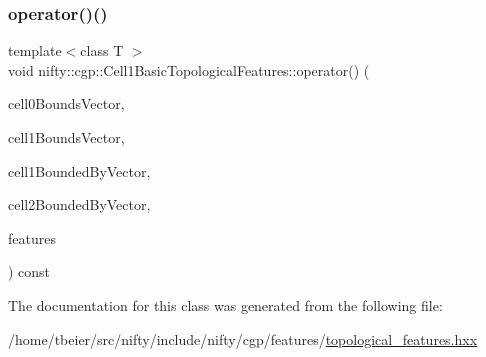 \mbox{\label{classnifty_1_1cgp_1_1Cell1BasicTopologicalFeatures_aab5336ea5c4f981c15b4860c4f476795}} 
\subsubsection{\texorpdfstring{operator()()}{operator()()}}
{\footnotesize\ttfamily template$<$class T $>$ \\
void nifty\+::cgp\+::\+Cell1\+Basic\+Topological\+Features\+::operator() (\begin{DoxyParamCaption}\item[{const \hyperlink{classnifty_1_1cgp_1_1CellBoundsVector}{Cell\+Bounds\+Vector}$<$ 2, 0 $>$ \&}]{cell0\+Bounds\+Vector,  }\item[{const \hyperlink{classnifty_1_1cgp_1_1CellBoundsVector}{Cell\+Bounds\+Vector}$<$ 2, 1 $>$ \&}]{cell1\+Bounds\+Vector,  }\item[{const \hyperlink{classnifty_1_1cgp_1_1CellBoundedByVector}{Cell\+Bounded\+By\+Vector}$<$ 2, 1 $>$ \&}]{cell1\+Bounded\+By\+Vector,  }\item[{const \hyperlink{classnifty_1_1cgp_1_1CellBoundedByVector}{Cell\+Bounded\+By\+Vector}$<$ 2, 2 $>$ \&}]{cell2\+Bounded\+By\+Vector,  }\item[{\hyperlink{classandres_1_1View}{nifty\+::marray\+::\+View}$<$ T $>$ \&}]{features }\end{DoxyParamCaption}) const\hspace{0.3cm}{\ttfamily [inline]}}



The documentation for this class was generated from the following file\+:\begin{DoxyCompactItemize}
\item 
/home/tbeier/src/nifty/include/nifty/cgp/features/\hyperlink{topological__features_8hxx}{topological\+\_\+features.\+hxx}\end{DoxyCompactItemize}
